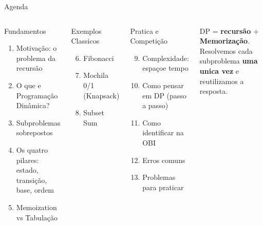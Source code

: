 \documentclass[aspectratio=169,10pt]{beamer}
\begin{document}
\begin{frame}{Agenda}
  \begin{columns}[t]
      \begin{block}{Fundamentos}
        \begin{enumerate}\footnotesize
          \item Motivação: o problema da recursão
          \item O que e Programação Dinâmica?
          \item Subproblemas sobrepostos
          \item Os quatro pilares: estado, transição,
                base, ordem
          \item Memoization vs Tabulação
        \end{enumerate}
      \end{block}
      \vspace{0.12cm}
      \begin{block}{Exemplos Classicos}
        \begin{enumerate}\setcounter{enumi}{5}\footnotesize
          \item Fibonacci
          \item Mochila 0/1 (Knapsack)
          \item Subset Sum
        \end{enumerate}
      \end{block}
      \begin{block}{Pratica e Competição}
        \begin{enumerate}\setcounter{enumi}{8}\footnotesize
          \item Complexidade: espaçoe tempo
          \item Como pensar em DP (passo a passo)
          \item Como identificar na OBI
          \item Erros comuns
          \item Problemas para praticar
        \end{enumerate}
      \end{block}
      \vspace{0.12cm}
      \begin{tcolorbox}[caixaDP,title={Ideia central}]
        \footnotesize
        DP = \textbf{recursão} + \textbf{Memorização}.\\
        Resolvemos cada subproblema \textbf{uma unica vez}
        e reutilizamos a resposta.
      \end{tcolorbox}
  \end{columns}
\end{frame}
\end{document}
